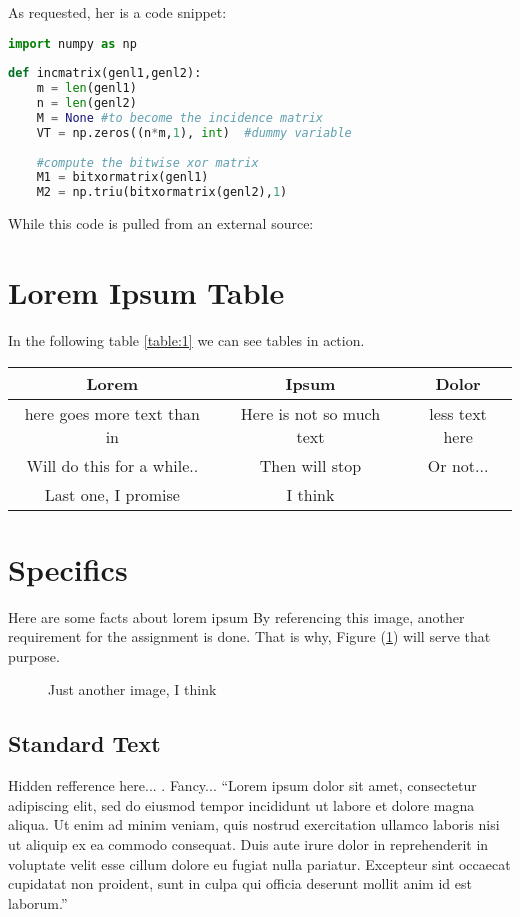 \documentclass[12pt]{article}
\begin{document}
As requested, her is a code snippet:
\begin{lstlisting}[language=Python]
import numpy as np
 
def incmatrix(genl1,genl2):
    m = len(genl1)
    n = len(genl2)
    M = None #to become the incidence matrix
    VT = np.zeros((n*m,1), int)  #dummy variable
 
    #compute the bitwise xor matrix
    M1 = bitxormatrix(genl1)
    M2 = np.triu(bitxormatrix(genl2),1) 
\end{lstlisting}

While this code is pulled from an external source:



\section{Lorem Ipsum Table}
In the following table \ref{table:1} we can see tables in action.
    \begin{center}
        \begin{tabular}{|c|c|c|} \hline
        Lorem & Ipsum & Dolor \\\hline
        here goes more text than in  & Here is not so much text & less text here \\\hline
        Will do this for a while.. & Then will stop & Or not... \\\hline
        Last one, I promise & I think & \citet{Cardelli2009} \\\hline
        \end{tabular}
        \label{table:1}
    \end{center}
\section{Specifics}
Here are some facts about lorem ipsum
By referencing this image, another requirement for the assignment is done. That is why, Figure (\ref{fig:doodle}) will serve that purpose.

\begin{figure}[H]
    \centering
    \caption{Just another image, I think}
    \label{fig:doodle}
\end{figure}
    \subsection{Standard Text}
    Hidden refference here... \citet{Loukides}. Fancy...
    ``Lorem ipsum dolor sit amet, consectetur adipiscing elit, sed do eiusmod tempor incididunt ut labore et dolore magna aliqua. Ut enim ad minim veniam, quis nostrud exercitation ullamco laboris nisi ut aliquip ex ea commodo consequat. Duis aute irure dolor in reprehenderit in voluptate velit esse cillum dolore eu fugiat nulla pariatur. Excepteur sint occaecat cupidatat non proident, sunt in culpa qui officia deserunt mollit anim id est laborum.''
\end{document}
